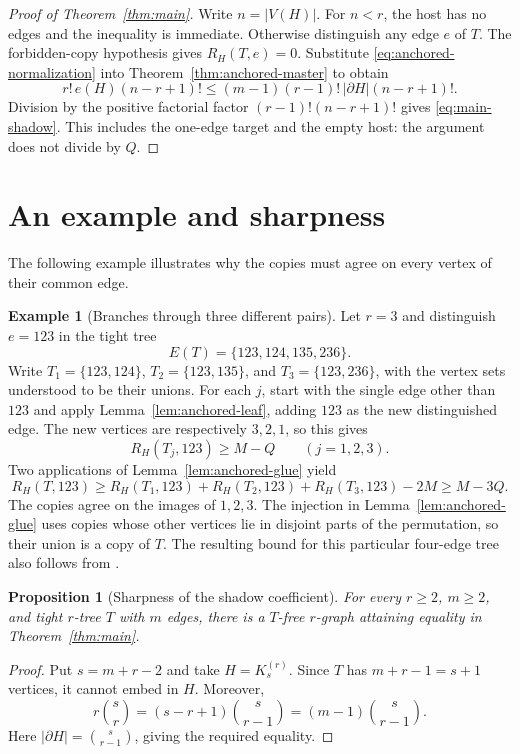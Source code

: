 \documentclass[11pt]{article}
\numberwithin{equation}{section}
\newtheorem{proposition}[theorem]{Proposition}
\theoremstyle{definition}
\newtheorem{example}[theorem]{Example}
\begin{document}
\begin{proof}[Proof of Theorem~\ref{thm:main}]
Write $n=|V(H)|$.  For $n<r$, the host has no edges and the inequality
is immediate.
Otherwise distinguish any edge $e$ of $T$.  The forbidden-copy
hypothesis gives $R_H(T,e)=0$.  Substitute
\eqref{eq:anchored-normalization} into
Theorem~\ref{thm:anchored-master} to obtain
\[
 r!\,e(H)(n-r+1)!
 \leq(m-1)(r-1)!\,|\partial H|(n-r+1)!.
\]
Division by the positive factorial factor $(r-1)!(n-r+1)!$ gives
\eqref{eq:main-shadow}.  This includes the one-edge target and the empty
host: the argument does not divide by $Q$.
\end{proof}

\section{An example and sharpness}
\label{sec:examples}

The following example illustrates why the copies must agree on every
vertex of their common edge.

\begin{example}[Branches through three different pairs]
\label{ex:three-faces}
Let $r=3$ and distinguish $e=123$ in the tight tree
\[
 E(T)=\{123,124,135,236\}.
\]
Write $T_1=\{123,124\}$, $T_2=\{123,135\}$, and
$T_3=\{123,236\}$, with the vertex sets understood to be their unions.
For each $j$, start with the single edge other than $123$ and apply
Lemma~\ref{lem:anchored-leaf}, adding $123$ as the new distinguished edge.
The new vertices are respectively $3,2,1$, so this gives
\[
 R_H(T_j,123)\geq M-Q\qquad(j=1,2,3).
\]
Two applications of Lemma~\ref{lem:anchored-glue} yield
\[
 R_H(T,123)\geq
 R_H(T_1,123)+R_H(T_2,123)+R_H(T_3,123)-2M
 \geq M-3Q.
\]
The copies agree on the images of $1,2,3$.  The injection in
Lemma~\ref{lem:anchored-glue} uses copies whose other vertices lie in
disjoint parts of the permutation, so their union is a copy of $T$.
The resulting
bound for this particular four-edge tree also follows from
\cite{FJKMV2019}.
\end{example}

\begin{proposition}[Sharpness of the shadow coefficient]
For every $r\geq2$, $m\geq2$, and tight $r$-tree $T$ with $m$
edges, there is a $T$-free $r$-graph attaining equality in
Theorem~\ref{thm:main}.
\end{proposition}

\begin{proof}
Put $s=m+r-2$ and take $H=K_s^{(r)}$.  Since $T$ has
$m+r-1=s+1$ vertices, it cannot embed in $H$.  Moreover,
\[
 r\binom{s}{r}=(s-r+1)\binom{s}{r-1}
             =(m-1)\binom{s}{r-1}.
\]
Here $|\partial H|=\binom{s}{r-1}$, giving the required equality.
\end{proof}
\end{document}
